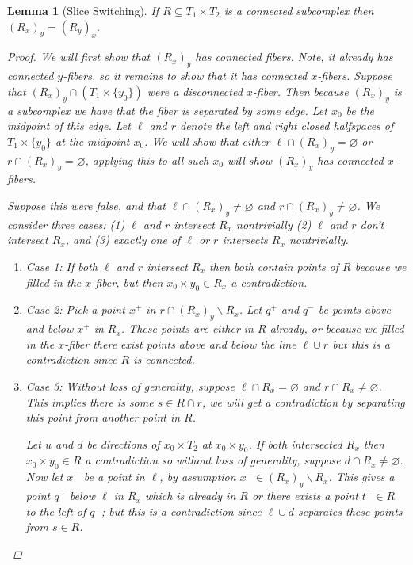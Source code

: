 \documentclass{article}
\newcommand{\rxy}{(R_x)_y}
\theoremstyle{mystyle}
\newtheorem{lem}{Lemma}[section]
\theoremstyle{remark}
\begin{document}
\begin{lem}
    [Slice Switching]
    If \(R \subseteq T_{1} \times T_{2}\) is a connected subcomplex then \( \left( R_{x} \right)_{y} = \left( R_{y} \right)_{x}\).
    \begin{proof}
        We will first show that \(\rxy\) has connected fibers. Note, it already has connected \(y\)-fibers, so it remains to show that it has connected \(x\)-fibers. Suppose that \(\rxy \cap ( T_{1} \times \{y_{0}\} )\) were a disconnected \(x\)-fiber. Then because \(\rxy\) is a subcomplex we have that the fiber is separated by some edge. Let \(x_{0}\) be the midpoint of this edge. Let \(\ell\) and \(r\) denote the left and right closed halfspaces of \(T_{1} \times \{y_{0}\}\) at the midpoint \(x_{0}\). We will show that either \(\ell \cap \rxy = \varnothing\) or \(r \cap \rxy = \varnothing\), applying this to all such \(x_{0}\) will show \(\rxy\) has connected \(x\)-fibers.
        
        Suppose this were false, and that \(\ell \cap \rxy \neq \varnothing\) and \(r \cap \rxy \neq \varnothing\). We consider three cases: (1) \(\ell\) and \(r\) intersect \(R_{x}\) nontrivially (2) \(\ell\) and \(r\) don't intersect \(R_{x}\), and (3) exactly one of \(\ell\) or \(r\) intersects \(R_{x}\) nontrivially.
        \begin{enumerate}
            \item Case 1: If both \(\ell\) and \(r\) intersect \(R_{x}\) then both contain points of \(R\) because we filled in the \(x\)-fiber, but then \(x_{0} \times y_{0}  \in R_{x}\) a contradiction.
            \item Case 2: Pick a point \(x^+\) in \(r \cap \rxy \smallsetminus R_{x} \). Let \(q^{+}\) and \(q^-\) be points above and below \(x^+\) in \(R_{x}\). These points are either in \(R\) already, or because we filled in the \(x\)-fiber there exist points above and below the line \(\ell \cup r\) but this is a contradiction since \(R\) is connected.
            \item Case 3: Without loss of generality, suppose \(\ell \cap R_{x} = \varnothing\) and \(r \cap R_{x} \neq \varnothing\). This implies there is some \(s \in R \cap r\), we will get a contradiction by separating this point from another point in \(R\). 
                
                Let \(u\) and \(d\) be directions of \(x_{0} \times T_{2}\) at \(x_{0} \times y_{0}\). If both intersected \(R_{x}\) then \(x_{0} \times y_{0} \in R \) a contradiction so without loss of generality, suppose \(d \cap R_{x} \neq \varnothing \). Now let \(x^-\) be a point in \(\ell\), by assumption \(x^- \in \rxy \smallsetminus R_{x} \). This gives a point \(q^-\) below \(\ell\) in \(R_{x}\) which is already in \(R\) or there exists a point \(t^- \in R\) to the left of \(q^-\); but this is a contradiction since \(\ell \cup d\) separates these points from \(s \in R\).
        \end{enumerate}


\end{proof}
\end{lem}
\end{document}
